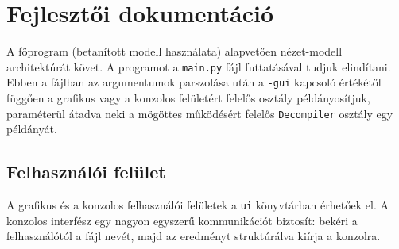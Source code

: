 \chapter{Fejlesztői dokumentáció}
\label{ch:impl}

A főprogram (betanított modell használata) alapvetően nézet-modell
architektúrát követ. A programot a \texttt{main.py} fájl futtatásával tudjuk elindítani.
Ebben a fájlban az argumentumok parszolása után a \texttt{-gui} kapcsoló értékétől függően
a grafikus vagy a konzolos felületért felelős osztály példányosítjuk, paraméterül átadva neki
a mögöttes működésért felelős \texttt{Decompiler} osztály egy példányát.

\section{Felhasználói felület}
A grafikus és a konzolos felhasználói felületek a \texttt{ui} könyvtárban
érhetőek el. A konzolos interfész egy nagyon egyszerű kommunikációt biztosít:
bekéri a felhasználótól a fájl nevét, majd az eredményt struktúrálva kiírja
a konzolra.

